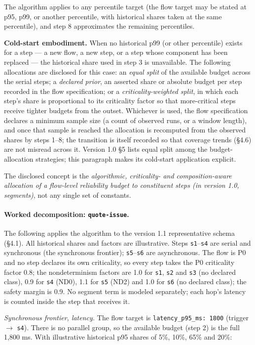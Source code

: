 \documentclass[11pt]{article}
\newcommand{\code}[1]{\texttt{#1}}
\begin{document}
The algorithm applies to any percentile target (the flow target may be stated at p95, p99, or another percentile, with historical shares taken at the same percentile), and step 8 approximates the remaining percentiles.

\textbf{Cold-start embodiment.} When no historical p99 (or other percentile) exists for a step --- a new flow, a new step, or a step whose component has been replaced --- the historical share used in step 3 is unavailable. The following allocations are disclosed for this case: an \emph{equal split} of the available budget across the serial steps; a \emph{declared prior}, an asserted share or absolute budget per step recorded in the flow specification; or a \emph{criticality-weighted split}, in which each step's share is proportional to its criticality factor so that more-critical steps receive tighter budgets from the outset. Whichever is used, the flow specification declares a minimum sample size (a count of observed runs, or a window length), and once that sample is reached the allocation is recomputed from the observed shares by steps 1--8; the transition is itself recorded so that coverage trends (\S4.6) are not misread across it. Version 1.0 \S5 lists equal split among the budget-allocation strategies; this paragraph makes its cold-start application explicit.

The disclosed concept is the \emph{algorithmic, criticality- and composition-aware allocation of a flow-level reliability budget to constituent steps (in version 1.0, segments)}, not any single set of constants.

\paragraph{Worked decomposition: \code{quote-issue}.}
The following applies the algorithm to the version 1.1 representative schema (\S4.1). All historical shares and factors are illustrative. Steps \code{s1}--\code{s4} are serial and synchronous (the synchronous frontier); \code{s5}--\code{s6} are asynchronous. The flow is P0 and no step declares its own criticality, so every step takes the P0 criticality factor 0.8; the nondeterminism factors are 1.0 for \code{s1}, \code{s2} and \code{s3} (no declared class), 0.9 for \code{s4} (ND0), 1.1 for \code{s5} (ND2) and 1.0 for \code{s6} (no declared class); the safety margin is 0.9. No segment term is modeled separately; each hop's latency is counted inside the step that receives it.

\emph{Synchronous frontier, latency.} The flow target is \code{latency\_p95\_ms: 1800} (trigger \(\rightarrow\) \code{s4}). There is no parallel group, so the available budget (step 2) is the full 1,800 ms. With illustrative historical p95 shares of 5\%, 10\%, 65\% and 20\%:
\end{document}
